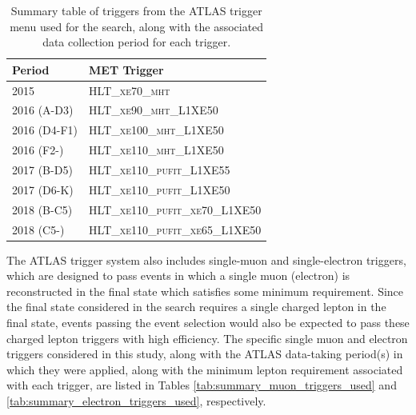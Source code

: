 \begin{table}[ht]
\caption{Summary table of \met triggers from the ATLAS trigger menu used for the search, along with the associated data collection period for each trigger.}
\label{tab:summary_triggers_used}
\footnotesize{
	\begin{center}
	\begin{tabular}{l l }
		\toprule
			Period & MET Trigger \\
			\midrule
			\midrule
			2015 & \textsc{HLT\_xe70\_mht} \\
			\midrule
			2016 (A-D3) & \textsc{HLT\_xe90\_mht\_L1XE50} \\
			\midrule
			2016 (D4-F1) & \textsc{HLT\_xe100\_mht\_L1XE50} \\
			\midrule
			2016 (F2-) & \textsc{HLT\_xe110\_mht\_L1XE50} \\
			\midrule
			2017 (B-D5) & \textsc{HLT\_xe110\_pufit\_L1XE55} \\
			\midrule
			2017 (D6-K) & \textsc{HLT\_xe110\_pufit\_L1XE50} \\
			\midrule
			2018 (B-C5) & \textsc{HLT\_xe110\_pufit\_xe70\_L1XE50} \\
			\midrule
			2018 (C5-) & \textsc{HLT\_xe110\_pufit\_xe65\_L1XE50} \\
		\bottomrule
	\end{tabular}
	\end{center}
	}
\end{table}

The ATLAS trigger system also includes single-muon and single-electron triggers, which are designed to pass events in which a single muon (electron) is reconstructed in the final state which satisfies some minimum \pt requirement. Since the final state considered in the search requires a single charged lepton in the final state, events passing the event selection would also be expected to pass these charged lepton triggers with high efficiency. The specific single muon and electron triggers considered in this study, along with the ATLAS data-taking period(s) in which they were applied, along with the minimum lepton \pt requirement associated with each trigger, are listed in Tables \ref{tab:summary_muon_triggers_used} and \ref{tab:summary_electron_triggers_used}, respectively.

